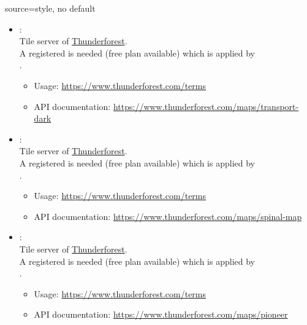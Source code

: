 \begin{docMrcKey}[supply]{source}{=}{style, no default}
\begin{itemize}
  \item{}:\\
    Tile server of \href{https://www.thunderforest.com}{Thunderforest}.\\
    A registered  is needed (free plan available)
    which is applied by\\
    .
    \begin{itemize}
    \item Usage: \url{https://www.thunderforest.com/terms}
    \item API documentation: \url{https://www.thunderforest.com/maps/transport-dark}
    \end{itemize}

  \item{}:\\
    Tile server of \href{https://www.thunderforest.com}{Thunderforest}.\\
    A registered  is needed (free plan available)
    which is applied by\\
    .
    \begin{itemize}
    \item Usage: \url{https://www.thunderforest.com/terms}
    \item API documentation: \url{https://www.thunderforest.com/maps/spinal-map}
    \end{itemize}

\clearpage
  \item{}:\\
    Tile server of \href{https://www.thunderforest.com}{Thunderforest}.\\
    A registered  is needed (free plan available)
    which is applied by\\
    .
    \begin{itemize}
    \item Usage: \url{https://www.thunderforest.com/terms}
    \item API documentation: \url{https://www.thunderforest.com/maps/pioneer}
    \end{itemize}


\end{itemize}
\end{docMrcKey}
